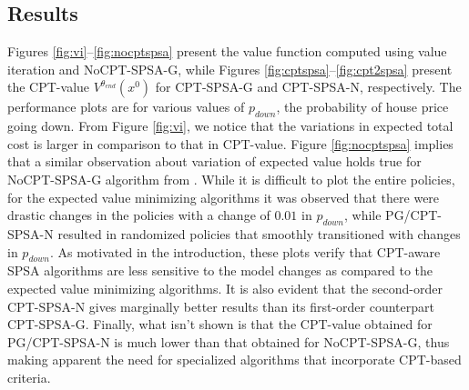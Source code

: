 \documentclass[11pt,letterpaper,english]{article}
\begin{document}
\subsection{Results} Figures \ref{fig:vi}--\ref{fig:nocptspsa} present the value function computed using value iteration and NoCPT-SPSA-G, while Figures \ref{fig:cptspsa}--\ref{fig:cpt2spsa} present the CPT-value $V^{\theta_{end}}(x^0)$ for CPT-SPSA-G and CPT-SPSA-N, respectively. The performance plots are for various values of $p_{down}$, the probability of house price going down. 
From Figure \ref{fig:vi}, we notice that the variations in expected total cost is larger in comparison to that in CPT-value. Figure \ref{fig:nocptspsa} implies that a similar observation about variation of expected value holds true for NoCPT-SPSA-G algorithm from \cite{bhatnagar2004simultaneous}. While it is difficult to plot the entire policies, for the expected value minimizing algorithms it was observed that there were drastic changes in the policies with a change of $0.01$ in $p_{down}$, while PG/CPT-SPSA-N resulted in randomized policies that smoothly transitioned with changes in $p_{down}$.
As motivated in the introduction, these plots verify that CPT-aware SPSA algorithms are less sensitive to the model changes as compared to the expected value minimizing algorithms. It is also evident that the second-order CPT-SPSA-N gives marginally better results than its first-order counterpart CPT-SPSA-G.
 Finally, what isn't shown is that the CPT-value obtained for PG/CPT-SPSA-N is much lower than that obtained for NoCPT-SPSA-G, thus making apparent the need for specialized algorithms that incorporate CPT-based criteria.




\end{document}
